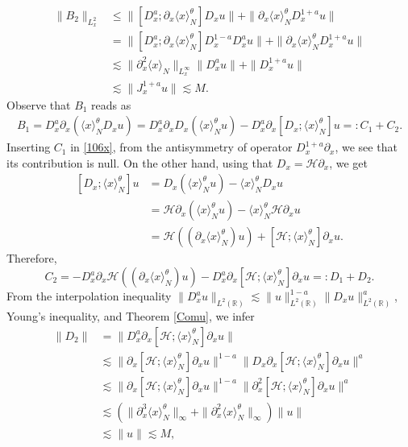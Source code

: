 \documentclass[reqno]{amsart}
\newcommand{\D}{D^{a}}
\newcommand{\h}{\mathcal H}
\newcommand{\la}{\langle x \rangle_{N}}
\newcommand{\R}{\mathbb R}
\newcommand{\p}{\partial}
\numberwithin{equation}{section}
\begin{document}
\begin{equation*}
\begin{split}
\|B_2\|_{L^2_x}%
&\leq \|[\D_x;\partial_{x}\la^\theta]D_x u\|+\|\partial_{x}\la^\theta D^{1+a}_x u\|\\
&=\|[\D_x;\partial_{x}\la^\theta]D^{1-a}_xD^{a}_x u\|+\|\partial_{x}\la^\theta D^{1+a}_x u\|\\
&\lesssim \|\partial_{x}^{2}\la\|_{L^\infty_x} \|\D_x u\|+\|D^{1+a}_x u\|\\
&\lesssim \|J^{1+a}_{x}u\|\lesssim M.
\end{split}
\end{equation*}
Observe that $B_1$ reads as 
\begin{equation*}
\begin{split}
B_1=\D_x \partial_{x}(\la^{\theta} D_x u)=\D_x \partial_{x}D_x(\la^{\theta} u)-\D_x \partial_{x}[D_x;\la^{\theta}]u
                          =:  C_1+C_2.
\end{split}
\end{equation*}
Inserting $C_1$ in \eqref{106x}, from the antisymmetry of operator $D^{1+a}_x\p_x$, we see that its contribution is null. On the other hand,
using that $D_x=\h \partial_x$, we get
\begin{equation*}
\begin{split}
[D_x;\la^{\theta}]u&=D_x(\la^{\theta} u)-\la^{\theta} D_x u\\
       &=\h\partial_{x}(\la^{\theta} u)-\la^{\theta} \h \partial_{x}u\\
       &=\h((\partial_{x}\la^{\theta})u)+[\h;\la^{\theta}]\partial_x u.
\end{split}
\end{equation*}
Therefore,
$$C_2=-\D_x \partial_x \h((\partial_x \la^{\theta})u)-\D_x \partial_x [\h;\la^{\theta}]\partial_x u=:D_1+D_2.$$
From  the interpolation inequality
$\|\D_x u\|_{L^2(\R)}\lesssim \|u\|_{L^2(\R)}^{1-a}\|D_x u\|_{L^2(\R)}^{a}$, Young's inequality, and Theorem \ref{Comu},
we infer
\begin{equation*}
\begin{split}
\|D_2\|&=\|\D_x  \partial_{x}[\h;\la^{\theta}]\partial_x u\|\\
       &\lesssim\|\partial_x [\h;\la^{\theta}]\partial_x u\|^{1-a}\|D_x \partial_x [\h;\la^{\theta}]\partial_x u\|^{a}\\
       &\lesssim\|\partial_x [\h;\la^{\theta}]\partial_x u\|^{1-a}\| \partial_{x}^2 [\h;\la^{\theta}]\partial_x u\|^{a}\\
       &\lesssim\left(\|\partial_{x}^3 \la^{\theta}\|_{\infty}+\|\partial_{x}^2 \la^{\theta}\|_{\infty}\right)\|u\|\\
       &\lesssim \|u\|\lesssim M,
\end{split}
\end{equation*}
\end{document}
